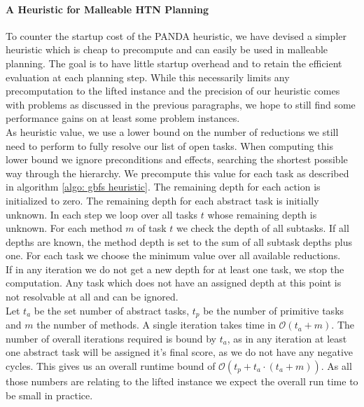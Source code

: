 \paragraph{A Heuristic for Malleable HTN Planning}
To counter the startup cost of the PANDA heuristic, we have devised a simpler heuristic which is cheap to precompute and can easily be used in malleable planning. The goal is to have little startup overhead and to retain the efficient evaluation at each planning step. While this necessarily limits any precomputation to the lifted instance and the precision of our heuristic comes with problems as discussed in the previous paragraphs, we hope to still find some performance gains on at least some problem instances. \\
As heuristic value, we use a lower bound on the number of reductions we still need to perform to fully resolve our list of open tasks. When computing this lower bound we ignore preconditions and effects, searching the shortest possible way through the hierarchy. We precompute this value for each task as described in algorithm \ref{algo: gbfs heuristic}. The remaining depth for each action is initialized to zero. The remaining depth for each abstract task is initially unknown. In each step we loop over all tasks $t$ whose remaining depth is unknown. For each method $m$ of task $t$ we check the depth of all subtasks. If all depths are known, the method depth is set to the sum of all subtask depths plus one. For each task we choose the minimum value over all available reductions. \\
If in any iteration we do not get a new depth for at least one task, we stop the computation. Any task which does not have an assigned depth at this point is not resolvable at all and can be ignored. \\
Let $t_a$ be the set number of abstract tasks, $t_p$ be the number of primitive tasks and $m$ the number of methods. A single iteration takes time in $\mathcal{O}(t_a + m)$. The number of overall iterations required is bound by $t_a$, as in any iteration at least one abstract task will be assigned it's final score, as we do not have any negative cycles. This gives us an overall runtime bound of $\mathcal{O}(t_p + t_a \cdot(t_a + m))$. As all those numbers are relating to the lifted instance we expect the overall run time to be small in practice.
